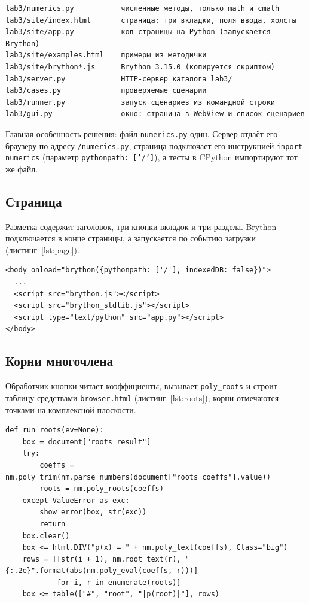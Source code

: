 \documentclass[14pt,a4paper]{extarticle}
\begin{document}
\begin{Verbatim}[fontsize=\scriptsize, frame=single, samepage=true]
lab3/numerics.py           численные методы, только math и cmath
lab3/site/index.html       страница: три вкладки, поля ввода, холсты
lab3/site/app.py           код страницы на Python (запускается Brython)
lab3/site/examples.html    примеры из методички
lab3/site/brython*.js      Brython 3.15.0 (копируется скриптом)
lab3/server.py             HTTP-сервер каталога lab3/
lab3/cases.py              проверяемые сценарии
lab3/runner.py             запуск сценариев из командной строки
lab3/gui.py                окно: страница в WebView и список сценариев
\end{Verbatim}

Главная особенность решения: файл \texttt{numerics.py} один. Сервер отдаёт его браузеру
по адресу \texttt{/numerics.py}, страница подключает его инструкцией \texttt{import
numerics} (параметр \texttt{pythonpath: ['/']}), а тесты в CPython импортируют тот же
файл.

\subsection{Страница}

Разметка содержит заголовок, три кнопки вкладок и три раздела. Brython подключается в
конце страницы, а запускается по событию загрузки (листинг~\ref{lst:page}).

\begin{lstlisting}[style=plain, caption={Подключение Brython}, label={lst:page}]
<body onload="brython({pythonpath: ['/'], indexedDB: false})">
  ...
  <script src="brython.js"></script>
  <script src="brython_stdlib.js"></script>
  <script type="text/python" src="app.py"></script>
</body>
\end{lstlisting}

\subsection{Корни многочлена}

Обработчик кнопки читает коэффициенты, вызывает \texttt{poly\_roots} и строит таблицу
средствами \texttt{browser.html} (листинг~\ref{lst:roots}); корни отмечаются точками на
комплексной плоскости.

\begin{lstlisting}[style=python, caption={Обработчик вкладки корней}, label={lst:roots}]
def run_roots(ev=None):
    box = document["roots_result"]
    try:
        coeffs = nm.poly_trim(nm.parse_numbers(document["roots_coeffs"].value))
        roots = nm.poly_roots(coeffs)
    except ValueError as exc:
        show_error(box, str(exc))
        return
    box.clear()
    box <= html.DIV("p(x) = " + nm.poly_text(coeffs), Class="big")
    rows = [[str(i + 1), nm.root_text(r), "{:.2e}".format(abs(nm.poly_eval(coeffs, r)))]
            for i, r in enumerate(roots)]
    box <= table(["#", "root", "|p(root)|"], rows)
\end{lstlisting}
\end{document}
